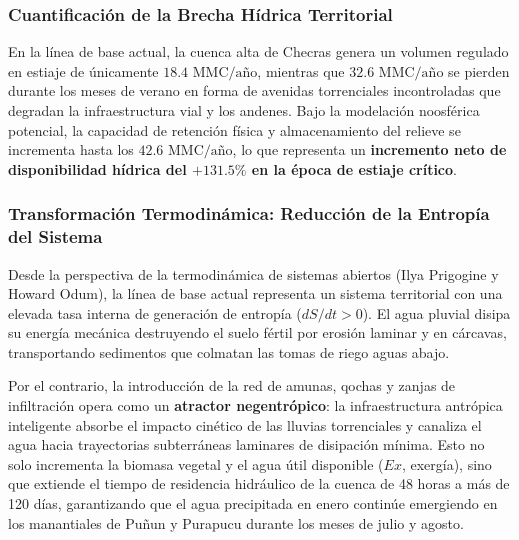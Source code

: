 \documentclass[11pt,a4paper]{article}
\begin{document}
\subsubsection{Cuantificación de la Brecha Hídrica Territorial}
En la línea de base actual, la cuenca alta de Checras genera un volumen regulado en estiaje de únicamente $18.4\text{ MMC/año}$, mientras que $32.6\text{ MMC/año}$ se pierden durante los meses de verano en forma de avenidas torrenciales incontroladas que degradan la infraestructura vial y los andenes. Bajo la modelación noosférica potencial, la capacidad de retención física y almacenamiento del relieve se incrementa hasta los \textbf{$42.6\text{ MMC/año}$}, lo que representa un \textbf{incremento neto de disponibilidad hídrica del $+131.5\%$ en la época de estiaje crítico}.

\subsubsection{Transformación Termodinámica: Reducción de la Entropía del Sistema}
Desde la perspectiva de la termodinámica de sistemas abiertos (Ilya Prigogine y Howard Odum), la línea de base actual representa un sistema territorial con una elevada tasa interna de generación de entropía ($dS/dt > 0$). El agua pluvial disipa su energía mecánica destruyendo el suelo fértil por erosión laminar y en cárcavas, transportando sedimentos que colmatan las tomas de riego aguas abajo.

Por el contrario, la introducción de la red de amunas, qochas y zanjas de infiltración opera como un \textbf{atractor negentrópico}: la infraestructura antrópica inteligente absorbe el impacto cinético de las lluvias torrenciales y canaliza el agua hacia trayectorias subterráneas laminares de disipación mínima. Esto no solo incrementa la biomasa vegetal y el agua útil disponible ($Ex$, exergía), sino que extiende el tiempo de residencia hidráulico de la cuenca de 48 horas a más de 120 días, garantizando que el agua precipitada en enero continúe emergiendo en los manantiales de Puñun y Purapucu durante los meses de julio y agosto.
\end{document}
